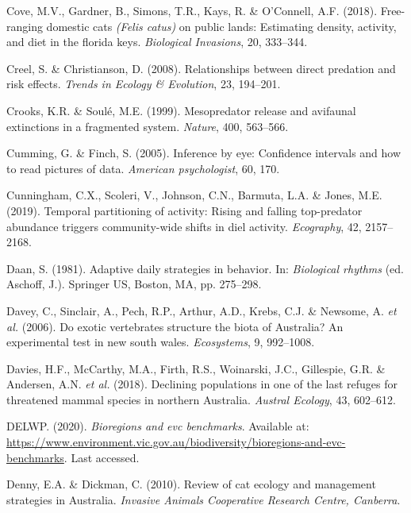 \documentclass[11pt,a4paper,titlepage,twoside,openright]{style/unimelbthesis}
\begin{document}
\begin{mainmatter}
\leavevmode\hypertarget{ref-cove2018free}{}%
Cove, M.V., Gardner, B., Simons, T.R., Kays, R. \& O'Connell, A.F. (2018). Free-ranging domestic cats \emph{(Felis catus)} on public lands: Estimating density, activity, and diet in the florida keys. \emph{Biological Invasions}, 20, 333--344.

\leavevmode\hypertarget{ref-creel2008relationships}{}%
Creel, S. \& Christianson, D. (2008). Relationships between direct predation and risk effects. \emph{Trends in Ecology \& Evolution}, 23, 194--201.

\leavevmode\hypertarget{ref-crooks1999mesopredator}{}%
Crooks, K.R. \& Soulé, M.E. (1999). Mesopredator release and avifaunal extinctions in a fragmented system. \emph{Nature}, 400, 563--566.

\leavevmode\hypertarget{ref-cumming2005inference}{}%
Cumming, G. \& Finch, S. (2005). Inference by eye: Confidence intervals and how to read pictures of data. \emph{American psychologist}, 60, 170.

\leavevmode\hypertarget{ref-cunningham2019temporal}{}%
Cunningham, C.X., Scoleri, V., Johnson, C.N., Barmuta, L.A. \& Jones, M.E. (2019). Temporal partitioning of activity: Rising and falling top-predator abundance triggers community-wide shifts in diel activity. \emph{Ecography}, 42, 2157--2168.

\leavevmode\hypertarget{ref-daan1981adaptive}{}%
Daan, S. (1981). Adaptive daily strategies in behavior. In: \emph{Biological rhythms} (ed. Aschoff, J.). Springer US, Boston, MA, pp. 275--298.

\leavevmode\hypertarget{ref-davey2006exotic}{}%
Davey, C., Sinclair, A., Pech, R.P., Arthur, A.D., Krebs, C.J. \& Newsome, A. \emph{et al.} (2006). Do exotic vertebrates structure the biota of Australia? An experimental test in new south wales. \emph{Ecosystems}, 9, 992--1008.

\leavevmode\hypertarget{ref-davies2018declining}{}%
Davies, H.F., McCarthy, M.A., Firth, R.S., Woinarski, J.C., Gillespie, G.R. \& Andersen, A.N. \emph{et al.} (2018). Declining populations in one of the last refuges for threatened mammal species in northern Australia. \emph{Austral Ecology}, 43, 602--612.

\leavevmode\hypertarget{ref-delwp2020}{}%
DELWP. (2020). \emph{Bioregions and evc benchmarks}. Available at: \url{https://www.environment.vic.gov.au/biodiversity/bioregions-and-evc-benchmarks}. Last accessed.

\leavevmode\hypertarget{ref-denny2010review}{}%
Denny, E.A. \& Dickman, C. (2010). Review of cat ecology and management strategies in Australia. \emph{Invasive Animals Cooperative Research Centre, Canberra}.


\end{mainmatter}
\end{document}
